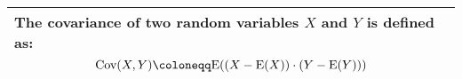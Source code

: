 {\tabulinesep=1mm
\begin{tabu}{|p{16cm} |}
\hline
\vspace{2 mm}
The \textbf{covariance} of two random variables $X$ and $Y$ is defined as:
\[\cov(X, Y) \coloneqq \E ((X - \E(X)) \cdot (Y - \E(Y)))\]
\\
\hline
\end{tabu}
}